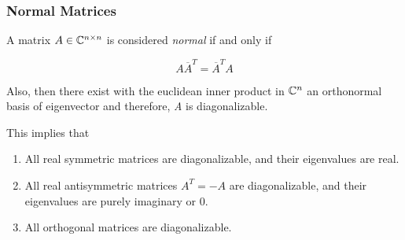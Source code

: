 \subsubsection{Normal Matrices}

A matrix \(A \in \mathbb{C}^{n \times n}\) is considered \emph{normal} if and only if 

\[
    A \overline{A}^{T} = \overline{A}^T A
\]  

Also, then there exist with the euclidean inner product in \(\mathbb{C}^n\) an orthonormal basis 
of eigenvector and therefore, \emph{A} is diagonalizable.
\vspace{\baselineskip}

This implies that

\begin{enumerate}
    
    \item All real symmetric matrices are diagonalizable, and their eigenvalues are real.
    
    \item All real antisymmetric matrices \(A^T = -A\) are diagonalizable, and their eigenvalues are 
          purely imaginary or 0. 

    \item All orthogonal matrices are diagonalizable.

\end{enumerate}


